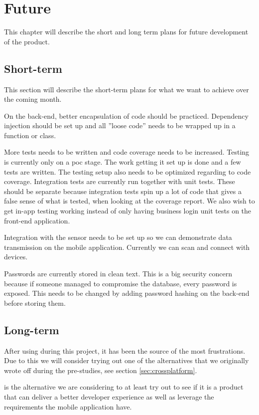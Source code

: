 \chapter{Future}
This chapter will describe the short and long term plans for future development of the product.

\section*{Short-term}
This section will describe the short-term plans for what we want to achieve over the coming month.

On the back-end, better encapsulation of code should be practiced.
Dependency injection should be set up and all ''loose code'' needs to be wrapped up in a function or class.

More tests needs to be written and code coverage needs to be increased.
Testing is currently only on a \gls{poc} stage. The work getting it set up is done and a few tests are written.
The testing setup also needs to be optimized regarding to code coverage.
Integration tests are currently run together with unit tests. 
These should be separate because integration tests spin up a lot of code that gives a false sense of what is tested, when looking at the coverage report.
We also wish to get in-app testing working instead of only having business login unit tests on the front-end application.

Integration with the  sensor needs to be set up so we can demonstrate  data transmission on the mobile application.
Currently we can scan and connect with  devices.

Passwords are currently stored in clean text. 
This is a big security concern because if someone managed to compromise the database, every password is exposed. 
This needs to be changed by adding password hashing on the back-end before storing them.

\section*{Long-term}
After using  during this project, it has been the source of the most frustrations.
Due to this we will consider trying out one of the alternatives that we originally wrote off during the pre-studies, see section \ref{sec:crossplatform}. 

 is the alternative we are considering to at least try out to see if it is a product that can deliver a better developer experience as well as leverage the requirements the mobile application have.

